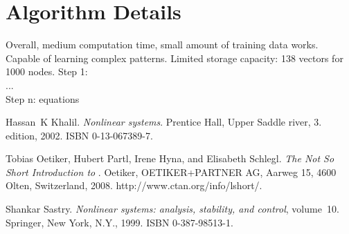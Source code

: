\documentclass[a4paper,12pt,oneside,onecolumn]{article} %
\begin{document}
\section*{Algorithm Details}
Overall, medium computation time, small amount of training data works. Capable of learning complex patterns. Limited storage capacity: 138 vectors for 1000 nodes.
Step 1:\\
...\\
Step n:
equations


\begin{thebibliography}{99}
Hassan~K Khalil.
\newblock \emph{Nonlinear systems}.
\newblock Prentice Hall, Upper Saddle river, 3. edition, 2002.
\newblock ISBN 0-13-067389-7.

Tobias Oetiker, Hubert Partl, Irene Hyna, and Elisabeth Schlegl.
\newblock \emph{The Not So Short Introduction to \LaTeXe}.
\newblock Oetiker, OETIKER+PARTNER AG, Aarweg 15, 4600 Olten, Switzerland,
  2008.
\newblock http://www.ctan.org/info/lshort/.

Shankar Sastry.
\newblock \emph{Nonlinear systems: analysis, stability, and control},
  volume~10.
\newblock Springer, New York, N.Y., 1999.
\newblock ISBN 0-387-98513-1.
\end{thebibliography}
\end{document}
